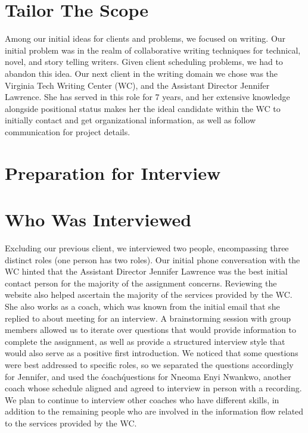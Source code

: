 \documentclass[12pt]{article} %
\begin{document}
\section{Tailor The Scope} %
  Among our initial ideas for clients and problems, we focused on writing.
  Our initial problem was in the realm of collaborative writing techniques for technical, novel, and story telling writers.
  Given client scheduling problems, we had to abandon this idea.
  Our next client in the writing domain we chose was the Virginia Tech Writing Center (WC), and the Assistant Director Jennifer Lawrence.
  She has served in this role for 7 years, and her extensive knowledge alongside positional status makes her the ideal candidate within the WC to initially contact and get organizational information, as well as follow communication for project details.

\section{Preparation for Interview} %

\section{Who Was Interviewed} %
Excluding our previous client, we interviewed two people, encompassing three distinct roles (one person has two roles).
Our initial phone conversation with the WC hinted that the Assistant Director Jennifer Lawrence was the best initial contact person for the majority of the assignment concerns.
Reviewing the website also helped ascertain the majority of the services provided by the WC.
She also works as a coach, which was known from the initial email that she replied to about meeting for an interview.
A brainstorming session with group members allowed us to iterate over questions that would provide information to complete the assignment, as well as provide a structured interview style that would also serve as a positive first introduction.
We noticed that some questions were best addressed to specific roles, so we separated the questions accordingly for Jennifer, and used the \'coach\' questions for Nneoma Enyi Nwankwo, another coach whose schedule aligned and agreed to interview in person with a recording.
We plan to continue to interview other coaches who have different skills, in addition to the remaining people who are involved in the information flow related to the services provided by the WC.
\end{document}

